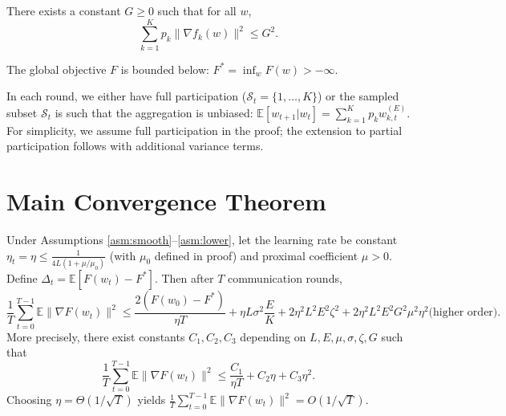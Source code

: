 \documentclass{article}
\begin{document}
\begin{assumption} \label{asm:dissimilarity}
    There exists a constant $G \geq 0$ such that for all $w$,
    \begin{equation}
        \sum_{k=1}^K p_k \| \nabla f_k(w) \|^2 \leq G^2.
    \end{equation}
\end{assumption}

\begin{assumption} \label{asm:lower}
    The global objective $F$ is bounded below: $F^* = \inf_w F(w) > -\infty$.
\end{assumption}

\begin{assumption} \label{asm:sampling}
    In each round, we either have full participation ($\mathcal{S}_t = \{1,\dots,K\}$) or the sampled subset $\mathcal{S}_t$ is such that the aggregation is unbiased: $\mathbb{E}[w_{t+1} | w_t] = \sum_{k=1}^K p_k w_{k,t}^{(E)}$. For simplicity, we assume full participation in the proof; the extension to partial participation follows with additional variance terms.
\end{assumption}

\section*{Main Convergence Theorem}

\begin{theorem} \label{thm:main}
    Under Assumptions \ref{asm:smooth}--\ref{asm:lower}, let the learning rate be constant $\eta_t = \eta \leq \frac{1}{4L(1+\mu/\mu_0)}$ (with $\mu_0$ defined in proof) and proximal coefficient $\mu > 0$. Define $\Delta_t = \mathbb{E}[F(w_t) - F^*]$. Then after $T$ communication rounds,
    \begin{equation}
        \frac{1}{T} \sum_{t=0}^{T-1} \mathbb{E} \| \nabla F(w_t) \|^2 \leq \frac{2(F(w_0) - F^*)}{\eta T} + \eta L \sigma^2 \frac{E}{K} + 2 \eta^2 L^2 E^2 \zeta^2 + 2 \eta^2 L^2 E^2 G^2 \mu^2 \eta^2 \text{(higher order)}.
    \end{equation}
    More precisely, there exist constants $C_1, C_2, C_3$ depending on $L, E, \mu, \sigma, \zeta, G$ such that
    \begin{equation}
        \frac{1}{T} \sum_{t=0}^{T-1} \mathbb{E} \| \nabla F(w_t) \|^2 \leq \frac{C_1}{\eta T} + C_2 \eta + C_3 \eta^2.
    \end{equation}
    Choosing $\eta = \Theta(1/\sqrt{T})$ yields $\frac{1}{T} \sum_{t=0}^{T-1} \mathbb{E} \| \nabla F(w_t) \|^2 = O(1/\sqrt{T})$.
\end{theorem}
\end{document}
